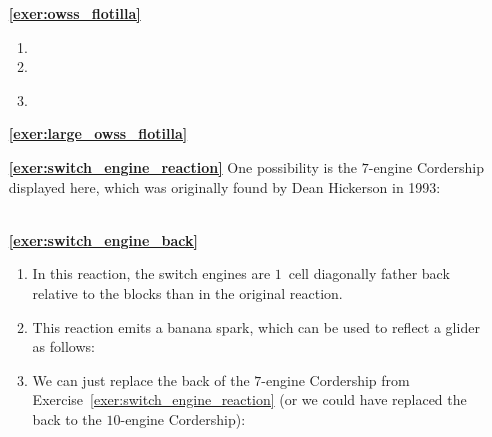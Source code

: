 \begin{multicols}{2}
\begin{itemize}[leftmargin=0em]
	\item[\bf\color{ocre}\sffamily\ref{exer:owss_flotilla}]
		\begin{enumerate}[leftmargin=1.5em,label=\bf\color{ocre}(\alph*)]
			\item {}
			
			\item {}
			
			\item {} \\
		\end{enumerate}
		

	\item[\bf\color{ocre}\sffamily\ref{exer:large_owss_flotilla}]  \\


	\item[\bf\color{ocre}\sffamily\ref{exer:switch_engine_reaction}] One possibility is the $7$-engine Cordership displayed here, which was originally found by Dean Hickerson in 1993: \\[-0.6em]
	
	 \\


	\item[\bf\color{ocre}\sffamily\ref{exer:switch_engine_back}]
	\begin{enumerate}[leftmargin=1.5em,label=\bf\color{ocre}(\alph*)]
		\item In this reaction, the switch engines are $1$~cell diagonally father back relative to the blocks than in the original reaction.
		
		\item This reaction emits a banana spark, which can be used to reflect a glider as follows: \\[-0.6em]
		
		
		\item We can just replace the back of the $7$-engine Cordership from Exercise~\ref{exer:switch_engine_reaction} (or we could have replaced the back to the $10$-engine Cordership): \\[-0.6em]
		
		 \\
	\end{enumerate}
	

\end{itemize}
\end{multicols}
